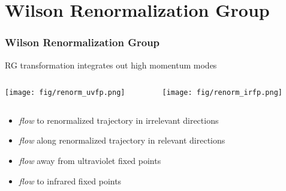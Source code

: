 
  \section{Wilson Renormalization Group}
  \addtocounter{framenumber}{-1}

  \begin{frame}
    \frametitle{Wilson Renormalization Group}
    RG transformation integrates out high momentum modes
    \begin{columns}[T]
      \begin{column}{.5\textwidth}
        \begin{block}{}
          \texttt{[image: fig/renorm\_uvfp.png]}
        \end{block}
      \end{column}
      \begin{column}{.5\textwidth}
        \begin{block}{}
          \texttt{[image: fig/renorm\_irfp.png]}
        \end{block}
      \end{column}
    \end{columns}
    \begin{itemize}
      \item \emph{\textcolor{flow}{flow}} to \textcolor{renorm_traj}{renormalized trajectory} in irrelevant directions
      \item \emph{\textcolor{flow}{flow}} along \textcolor{renorm_traj}{renormalized trajectory} in relevant directions
      \item \emph{\textcolor{flow}{flow}} away from \textcolor{uvfp}{ultraviolet fixed points}
      \item \emph{\textcolor{flow}{flow}} to \textcolor{irfp}{infrared fixed points}
    \end{itemize}
  \end{frame}

